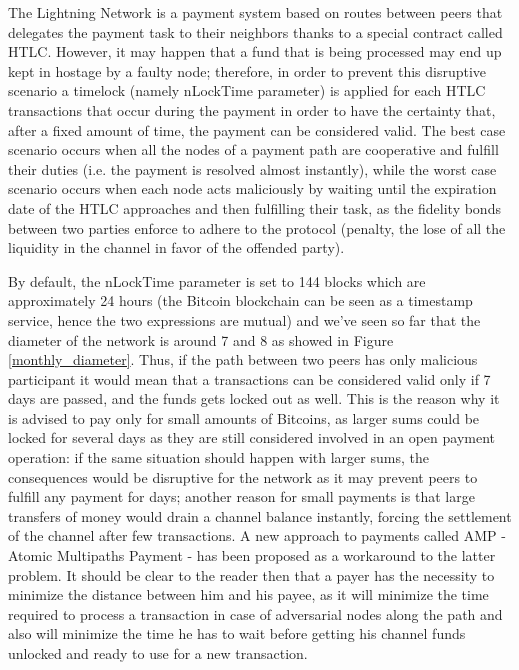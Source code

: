 	The Lightning Network is a payment system based on routes between peers that delegates the payment task to their neighbors thanks to a special contract called HTLC. However, it may happen that a fund that is being processed may end up kept in hostage by a faulty node; therefore, in order to prevent this disruptive scenario a timelock (namely nLockTime parameter) is applied for each HTLC transactions that occur during the payment in order to have the certainty that, after a fixed amount of time, the payment can be considered valid. The best case scenario occurs when all the nodes of a payment path are cooperative and fulfill their duties (i.e. the payment is resolved almost instantly), while the worst case scenario occurs when each node acts maliciously by waiting until the expiration date of the HTLC approaches and then fulfilling their task, as the fidelity bonds between two parties enforce to adhere to the protocol (penalty, the lose of all the liquidity in the channel in favor of the offended party). 
	
	By default, the nLockTime parameter is set to 144 blocks which are approximately 24 hours (the Bitcoin blockchain can be seen as a timestamp service, hence the two expressions are mutual) and we've seen so far that the diameter of the network is around 7 and 8 as showed in Figure \ref{monthly_diameter}. Thus, if the path between two peers has only malicious participant it would mean that a transactions can be considered valid only if 7 days are passed, and the funds gets locked out as well. This is the reason why it is advised to pay only for small amounts of Bitcoins, as larger sums could be locked for several days as they are still considered involved in an open payment operation: if the same situation should happen with larger sums, the consequences would be disruptive for the network as it may prevent peers to fulfill any payment for days; another reason for small payments is that large transfers of money would drain a channel balance instantly, forcing the settlement of the channel after few transactions. A new approach to payments called AMP \cite{Amp2018} - Atomic Multipaths Payment - has been proposed as a workaround to the latter problem. It should be clear to the reader then that a payer has the necessity to minimize the distance between him and his payee, as it will minimize the time required to process a transaction in case of adversarial nodes along the path and also will minimize the time he has to wait before getting his channel funds unlocked and ready to use for a new transaction.
	
